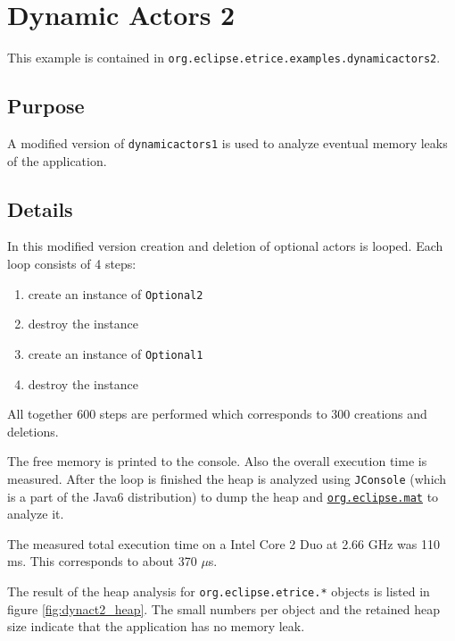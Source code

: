 \section{Dynamic Actors 2}

This example is contained in \texttt{org.eclipse.etrice.examples.dynamicactors2}.

\subsection{Purpose}

A modified version of \texttt{dynamicactors1} is used to analyze eventual memory leaks of the application.

\subsection{Details}

In this modified version creation and deletion of optional actors is looped.
Each loop consists of 4 steps:

\begin{enumerate}
\item create an instance of \texttt{Optional2}
\item destroy the instance
\item create an instance of \texttt{Optional1}
\item destroy the instance
\end{enumerate}

All together 600 steps are performed which corresponds to 300 creations and deletions.

The free memory is printed to the console. Also the overall execution time is measured.
After the loop is finished the heap is analyzed using \texttt{JConsole} (which is a part
of the Java6 distribution) to dump the heap and
\href{http://www.eclipse.org/mat/}{\texttt{org.eclipse.mat}} to analyze it.

The measured total execution time on a Intel Core 2 Duo at 2.66 GHz was 110 ms.
This corresponds to about 370 $\mu$s.

The result of the heap analysis for \texttt{org.eclipse.etrice.*} objects is listed in figure \ref{fig:dynact2_heap}.
The small numbers per object and the retained heap size indicate that the application has no memory leak.

